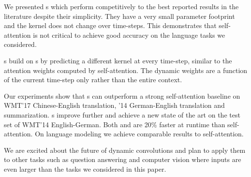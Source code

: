 
We presented \sdconvfull{}s which perform competitively to the best reported results in the literature despite their simplicity. 
They have a very small parameter footprint and the kernel does not change over time-steps. 
This demonstrates that self-attention is not critical to achieve good accuracy on the language tasks we considered.

\Tvsdconvfull{}s build on \sdconvfull{}s by predicting a different kernel at every time-step, similar to the attention weights computed by self-attention. 
The dynamic weights are a function of the current time-step only rather than the entire context.

Our experiments show that \sdconvfull{}s can outperform a strong self-attention baseline on WMT'17 Chinese-English translation, \iwslt{}'14 German-English translation and \cnndm{} summarization. 
\Tvsdconvfull{}s improve further and achieve a new state of the art on the test set of WMT'14 English-German.
Both \sdconvfull{} and \tvsdconvfull{} are 20\% faster at runtime than self-attention.
On \gbw{} language modeling we achieve comparable results to self-attention.

We are excited about the future of dynamic convolutions and plan to apply them to other tasks such as question answering and computer vision where inputs are even larger than the tasks we considered in this paper.